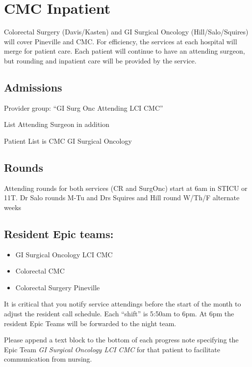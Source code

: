 \documentclass[
]{book}
\providecommand{\tightlist}{%
  \setlength{\itemsep}{0pt}\setlength{\parskip}{0pt}}
\begin{document}
\hypertarget{cmc-inpatient}{%
\chapter{CMC Inpatient}\label{cmc-inpatient}}

Colorectal Surgery (Davis/Kasten) and GI Surgical Oncology (Hill/Salo/Squires) will cover Pineville and CMC. For efficiency, the services at each hospital will merge for patient care. Each patient will continue to have an attending surgeon, but rounding and inpatient care will be provided by the service.

\hypertarget{admissions}{%
\section{Admissions}\label{admissions}}

Provider group: ``GI Surg Onc Attending LCI CMC''

List Attending Surgeon in addition

Patient List is CMC GI Surgical Oncology

\hypertarget{rounds}{%
\section{Rounds}\label{rounds}}

Attending rounds for both services (CR and SurgOnc) start at 6am in STICU or 11T. Dr Salo rounds M-Tu and Drs Squires and Hill round W/Th/F alternate weeks

\hypertarget{resident-epic-teams}{%
\section{Resident Epic teams:}\label{resident-epic-teams}}

\begin{itemize}
\tightlist
\item
  GI Surgical Oncology LCI CMC
\item
  Colorectal CMC
\item
  Colorectal Surgery Pineville
\end{itemize}

It is critical that you notify service attendings before the start of the month to adjust the resident call schedule. Each ``shift'' is 5:50am to 6pm. At 6pm the resident Epic Teams will be forwarded to the night team.

Please append a text block to the bottom of each progress note specifying the Epic Team \emph{GI Surgical Oncology LCI CMC} for that patient to facilitate communication from nursing.
\end{document}
